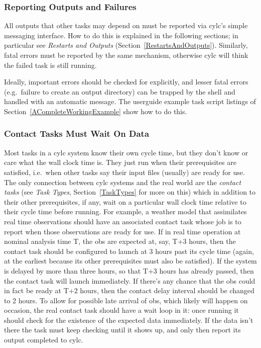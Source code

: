 \documentclass[11pt,a4paper]{article}
\begin{document}
\subsubsection{Reporting Outputs and Failures}

All outputs that other tasks may depend on must be reported via cylc's
simple messaging interface. How to do this is explained in the following
sections; in particular see {\em Restarts and Outputs}
(Section~\ref{RestartsAndOutputs}). Similarly, fatal errors must be
reported by the same mechanism, otherwise cylc will think the failed
task is still running. 

Ideally, important errors should be checked for explicitly, and lesser
fatal errors (e.g.\ failure to create an output directory) can be
trapped by the shell and handled with an automatic message. The
userguide example task script listings of
Section~\ref{ACompleteWorkingExample} show how to do this.

\subsubsection{Contact Tasks Must Wait On Data}

Most tasks in a cylc system know their own cycle time, but they don't
know or care what the wall clock time is.  They just run when their
prerequisites are satisfied, i.e.\  when other tasks say their input
files (usually) are ready for use. The only connection between cylc
systems and the real world are the {\em contact tasks} (see {\em Task
Types}, Section~\ref{TaskTypes} for more on this) which in addition to
their other prerequisites, if any, wait on a particular wall clock time
relative to their cycle time before running.  For example, a weather
model that assimilates real time observations should have an associated
contact task whose job is to report when those observations are ready
for use.  If in real time operation at nominal analysis time T, the obs
are expected at, say, T+3 hours, then the contact task should be
configured to launch at 3 hours past its cycle time (again, at the
earliest because its other prerequisites must also be satisfied).
If the system is delayed by more than three hours, so that T+3 hours 
has already passed, then the contact task will launch immediately.
If there's any chance that the obs could in fact be ready at T+2 hours,
then the contact delay interval should be changed to 2 hours.  To allow
for possible late arrival of obs, which likely will happen on occasion,
the real contact task should have a wait loop in it: once running it
should check for the existence of the expected data immediately. If the
data isn't there the task must keep checking until it shows up, and only then
report its output completed to cylc. 
\end{document}
